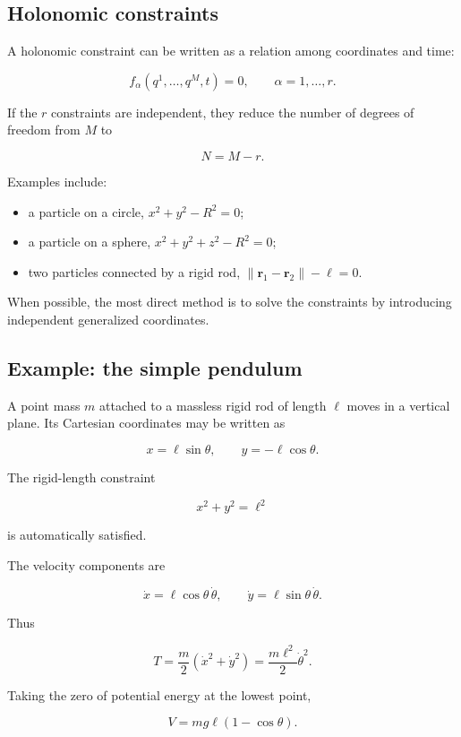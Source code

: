 \subsection{Holonomic constraints}

A holonomic constraint can be written as a relation among coordinates and time:

\[
f_{\alpha}(q^{1},\ldots,q^{M},t)=0,
\qquad
\alpha=1,\ldots,r.
\]

If the \(r\) constraints are independent, they reduce the number of degrees of freedom from \(M\) to

\[
N=M-r.
\]

Examples include:

\begin{itemize}
    \item a particle on a circle, \(x^{2}+y^{2}-R^{2}=0\);
    \item a particle on a sphere, \(x^{2}+y^{2}+z^{2}-R^{2}=0\);
    \item two particles connected by a rigid rod, \(\lVert\mathbf{r}_{1}-\mathbf{r}_{2}\rVert-\ell=0\).
\end{itemize}

When possible, the most direct method is to solve the constraints by introducing independent generalized coordinates.

\subsection{Example: the simple pendulum}

A point mass \(m\) attached to a massless rigid rod of length \(\ell\) moves in a vertical plane. Its Cartesian coordinates may be written as

\[
x=\ell\sin\theta,
\qquad
y=-\ell\cos\theta.
\]

The rigid-length constraint

\[
x^{2}+y^{2}=\ell^{2}
\]

is automatically satisfied.

The velocity components are

\[
\dot x=\ell\cos\theta\,\dot\theta,
\qquad
\dot y=\ell\sin\theta\,\dot\theta.
\]

Thus

\[
T
=
\frac{m}{2}
\left(
\dot x^{2}+\dot y^{2}
\right)
=
\frac{m\ell^{2}}{2}\dot\theta^{2}.
\]

Taking the zero of potential energy at the lowest point,

\[
V
=
mg\ell(1-\cos\theta).
\]

